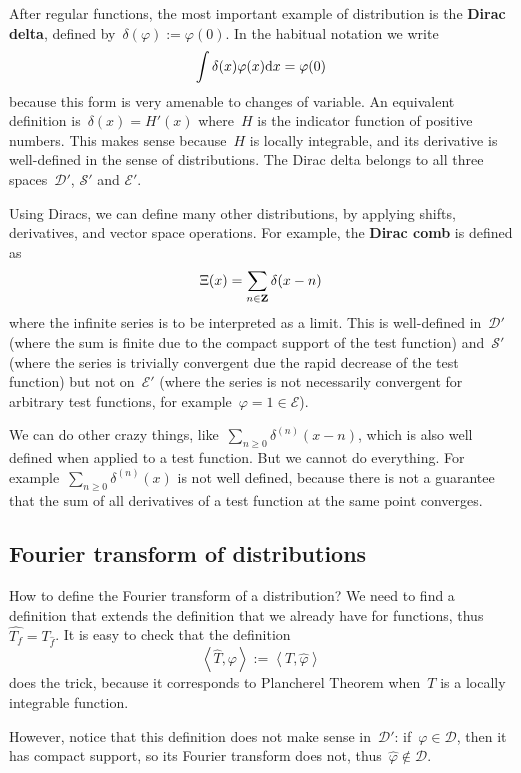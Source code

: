 After regular functions, the most important example of distribution
is the {\bf Dirac delta}, defined by~$\delta(\varphi):=\varphi(0)$.
In the habitual notation we write
$$
\int\delta(x)\varphi(x)\mathrm{d} x = \varphi(0)
$$
because this form is very amenable to changes of variable.
An equivalent definition is~$\delta(x)=H'(x)$ where~$H$ is the
indicator function of positive numbers.  This makes sense because~$H$
is locally integrable, and its derivative is well-defined in the
sense of distributions.  The Dirac delta belongs to all three
spaces~$\mathcal{D}'$, $\mathcal{S}'$ and $\mathcal{E}'$.

Using Diracs, we can define many other distributions, by applying
shifts, derivatives, and vector space operations.  For example, the
{\bf Dirac comb} is defined as
$$
\Xi(x)=\sum_{n\in\mathbf{Z}}\delta(x-n)
$$
where the infinite series is to be interpreted as a limit.  This is
well-defined in~$\mathcal{D}'$ (where the sum is finite due to the
compact support of the test function)
and~$\mathcal{S}'$ (where the series is trivially convergent due the
rapid decrease of the test function) but not on~$\mathcal{E}'$ (where
the series is not necessarily convergent for arbitrary test
functions, for example~$\varphi=1\in\mathcal{E}$).

We can do other crazy things, like~$\sum_{n\ge 0}\delta^{(n)}(x-n)$,
which is also well defined when applied to a test function.  But we
cannot do everything.  For example~$\sum_{n\ge 0}\delta^{(n)}(x)$ is
not well defined, because there is not a guarantee that the sum of
all derivatives of a test function at the same point converges.

\subsection{Fourier transform of distributions}

How to define the Fourier transform of a distribution?
We need to find a definition that extends the definition that we
already have for functions, thus~$\widehat{T_f}=T_{\widehat{f}}$.
It is easy to check that the definition
$$
\left<\widehat{T},\varphi\right>
:=
\left<T,\widehat{\varphi}\right>
$$
does the trick, because it corresponds to Plancherel Theorem when~$T$
is a locally integrable function.

However, notice that this definition does not make sense
in~$\mathcal{D}'$:  if~$\varphi\in\mathcal{D}$, then it has compact
support, so its Fourier transform does not,
thus~$\widehat{\varphi}\not\in\mathcal{D}$.

